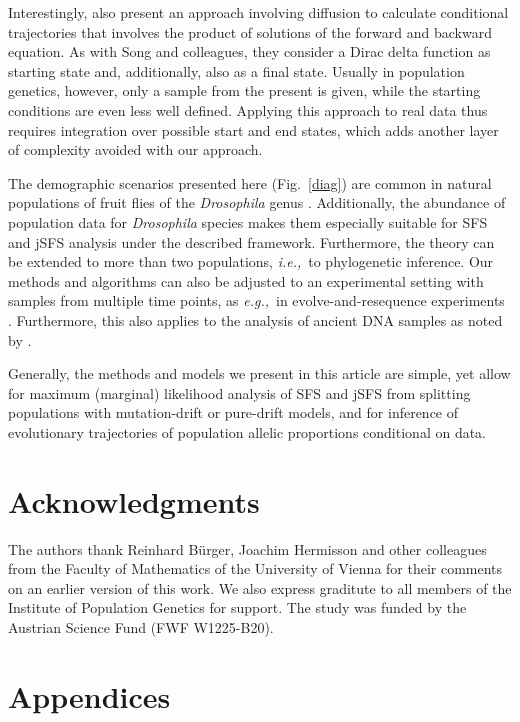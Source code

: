 \documentclass[preprint]{elsarticle}
\newcommand\eg{{\it e.g.,}}
\newcommand\ie{{\it i.e.,}}
\begin{document}
Interestingly, \citet{Zhao13} also present an approach involving diffusion to calculate conditional trajectories that involves the product of solutions of the forward and backward equation. As with Song and colleagues, they consider a Dirac delta function as starting state and, additionally, also as a final state. Usually in population genetics, however, only a sample from the present is given, while the starting conditions are even less well defined. Applying this approach to real data thus requires integration over possible start and end states, which adds another layer of complexity avoided with our approach. 

The demographic scenarios presented here (Fig.~\ref{diag}) are common in natural populations of fruit flies of the \textit{Drosophila} genus \citep[\eg][]{Li06,Zeng10a,Pool12}. Additionally, the abundance of population data for \textit{Drosophila} species makes them especially suitable for SFS and jSFS analysis under the described framework. Furthermore, the theory can be extended to more than two populations, \ie\ to phylogenetic inference. Our methods and algorithms can also be adjusted to an experimental setting with samples from multiple time points, as \eg\ in evolve-and-resequence experiments \citep{Kofl14}. Furthermore, this also applies to the analysis of ancient DNA samples as noted by \citet{Stei14}.

Generally, the methods and models we present in this article are simple, yet allow for maximum (marginal) likelihood analysis of SFS and jSFS from splitting populations with mutation-drift or pure-drift models, and for inference of evolutionary trajectories of population allelic proportions conditional on data. 

\section*{Acknowledgments}

The authors thank Reinhard B\"urger, Joachim Hermisson and other colleagues from the Faculty of Mathematics of the University of Vienna for their comments on an earlier version of this work. We also express graditute to all members of the Institute of Population Genetics for support. The study was funded by the Austrian Science Fund (FWF W1225-B20). %

\section{Appendices}
\end{document}
